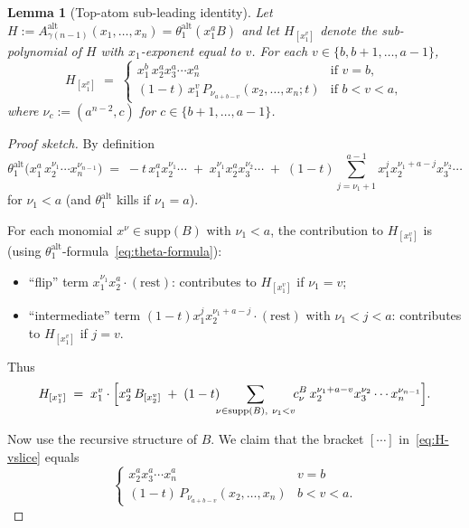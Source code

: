 \documentclass[11pt]{article}
\newtheorem{lemma}[theorem]{Lemma}
\theoremstyle{definition}
\newcommand{\Aalt}{A^{\mathrm{alt}}}
\newcommand{\thalt}{\theta^{\mathrm{alt}}}
\begin{document}
\begin{lemma}[Top-atom sub-leading identity]\label{lem:top-atom}
Let $H := \Aalt_{\gamma(n-1)}(x_1, \ldots, x_n) = \thalt_1(x_1^a B)$ and let
$H_{[x_1^v]}$ denote the sub-polynomial of $H$ with $x_1$-exponent equal to
$v$. For each $v \in \{b, b+1, \ldots, a-1\}$,
\[
  H_{[x_1^v]} \;=\;
  \begin{cases}
    x_1^b\, x_2^a x_3^a \cdots x_n^a & \text{if } v = b,\\[2pt]
    (1-t)\, x_1^v\, P_{\nu_{a+b-v}}(x_2, \ldots, x_n; t) & \text{if } b < v < a,
  \end{cases}
\]
where $\nu_c := (a^{n-2}, c)$ for $c \in \{b+1, \ldots, a-1\}$.
\end{lemma}
\begin{proof}[Proof sketch]
By definition
\begin{equation}\label{eq:theta-formula}
  \thalt_1\bigl(x_1^a\, x_2^{\nu_1} \cdots x_n^{\nu_{n-1}}\bigr)
  \;=\; -t\, x_1^a x_2^{\nu_1} \cdots \;+\; x_1^{\nu_1} x_2^a x_3^{\nu_2} \cdots \;+\; (1-t)\!\!\!\sum_{j=\nu_1+1}^{a-1}\!\! x_1^j x_2^{\nu_1+a-j} x_3^{\nu_2} \cdots
\end{equation}
for $\nu_1 < a$ (and $\thalt_1$ kills if $\nu_1 = a$).

For each monomial $x^\nu \in \mathrm{supp}(B)$ with $\nu_1 < a$, the
contribution to $H_{[x_1^v]}$ is (using $\thalt_1$-formula~\eqref{eq:theta-formula}):
\begin{itemize}
\item ``flip'' term $x_1^{\nu_1} x_2^a \cdot (\text{rest})$: contributes to
  $H_{[x_1^v]}$ if $\nu_1 = v$;
\item ``intermediate'' term $(1-t) x_1^j x_2^{\nu_1+a-j} \cdot (\text{rest})$ with
  $\nu_1 < j < a$: contributes to $H_{[x_1^v]}$ if $j = v$.
\end{itemize}

Thus
\begin{equation}\label{eq:H-vslice}
  H_{[x_1^v]} \;=\; x_1^v \cdot \Bigl[ x_2^a\, B_{[x_2^v]} \;+\; (1-t)\!\!\!\sum_{\nu \in \mathrm{supp}(B),\ \nu_1 < v}\!\! c^B_\nu\, x_2^{\nu_1 + a - v} x_3^{\nu_2} \cdots x_n^{\nu_{n-1}} \Bigr].
\end{equation}

Now use the recursive structure of $B$. We claim that the bracket
$[\cdots]$ in~\eqref{eq:H-vslice} equals
\begin{equation}\label{eq:bracket-target}
  \begin{cases}
    x_2^a x_3^a \cdots x_n^a & v = b\\[2pt]
    (1-t)\, P_{\nu_{a+b-v}}(x_2, \ldots, x_n) & b < v < a.
  \end{cases}
\end{equation}


\end{proof}
\end{document}
